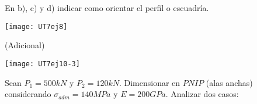 En b), c) y d) indicar como orientar el perfil o escuadría.

\begin{center}
\texttt{[image: UT7ej8]}
\end{center}


\ejercicio (Adicional)

\begin{center}
\texttt{[image: UT7ej10-3]}
\end{center}

Sean $P_1=500 kN$ y $P_2=120 kN$. Dimensionar en $PNIP$ (alas anchas) considerando $\sigma_{adm}=140MPa$ y $E=200GPa$. Analizar dos casos:

\begin{figure}[htb]
	\centering
\subfloat[Caso 1]{
\texttt{[image: UT7ej10-1]}
	\label{fig:UT710.1}}
~
\subfloat[Caso 2]{
\texttt{[image: UT7ej10-2]}
	\label{fig:UT710.2}}
\caption{}
	\label{fig:UT710}
\end{figure}
